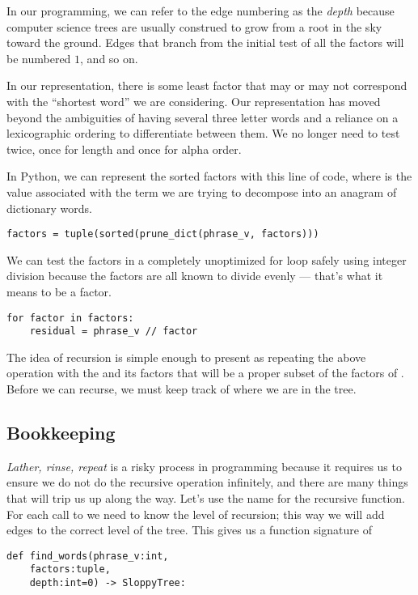 \documentclass[letterpaper, 11pt]{article}
\begin{document}
In our programming, we can refer to the edge numbering as the \emph{depth}
because computer science trees are usually construed to grow from a root
in the sky toward the ground. Edges that branch from the initial test of
all the factors will be numbered $1$, and so on.

In our representation, there is some least factor that may or may
not correspond with the ``shortest word'' we are considering.  Our
representation has moved beyond the ambiguities of having several
three letter words and a reliance on a lexicographic ordering to
differentiate between them. We no longer need to test twice, once
for length and once for alpha order.

In Python, we can represent the sorted factors with this line of code,
where  is the value associated with the term we are
trying to decompose into an anagram of dictionary words.

\begin{verbatim}
factors = tuple(sorted(prune_dict(phrase_v, factors)))
\end{verbatim}
We can test the factors in a completely unoptimized for loop safely using 
integer division because the factors are all known to divide 
evenly --- that's what it means to be a factor.
\begin{verbatim}
for factor in factors:
    residual = phrase_v // factor
\end{verbatim}

The idea of recursion is simple enough to present as repeating the above
operation with the  and its factors that will be a proper
subset of the factors of . Before we can recurse, we must
keep track of where we are in the tree.

\subsection{Bookkeeping}

\emph{Lather, rinse, repeat} is a risky process in programming because it requires
us to ensure we do not do the recursive operation infinitely, and there are many
things that will trip us up along the way. Let's use the name  for 
the recursive function. For each call to  we need to know the
level of recursion; this way we will add edges to the correct level of the
tree. This gives us a function signature of 

\begin{verbatim}
def find_words(phrase_v:int,
    factors:tuple,
    depth:int=0) -> SloppyTree:
\end{verbatim}
\end{document}

